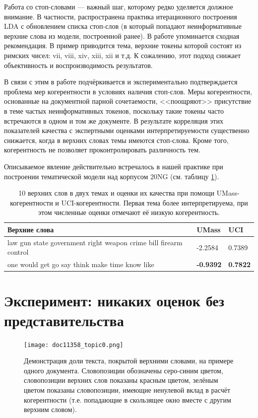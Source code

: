 Работа со стоп-словами --- важный шаг, которому редко уделяется должное внимание. В частности, распространена практика итерационного построения LDA с обновлением списка стоп-слов (в который попадают неинформативные верхние слова из модели, построенной ранее). В работе \cite{boydcare} упоминается сходная рекомендация. В пример приводится тема, верхние токены которой состоят из римских чисел: vii, viii, xiv, xiii, xii и т.д. К сожалению, этот подход снижает объективность и воспроизводимость результатов.

В связи с этим в работе \cite{fan2019assessing} подчёркивается и экспериментально подтверждается проблема мер когерентности в условиях наличия стоп-слов. Меры когерентности, основанные на документной парной сочетаемости, <<поощряют>> присутствие в теме частых неинформативных токенов, поскольку такие токены часто встречаются в одном и том же документе. В результате корреляция этих показателей качества с экспертными оценками интерпретируемости существенно снижается, когда в верхних словах темы имеются стоп-слова. Кроме того, когерентность не позволяет проконтролировать различность тем.

Описываемое явление действительно встречалось в нашей практике при построении тематической модели над корпусом 20NG (см. таблицу \ref{fig:law_gun_would}).

\begin{table}[ht]
    \caption{10 верхних слов в двух темах и оценки их качества при помощи UMass-когерентности и UCI-когерентности. Первая тема более интерпретируема, при этом численные оценки отмечают её низкую когерентность.}
    \label{fig:law_gun_would}
    \small
    \begin{tabular}{ | p{7.5cm}| p{3.5cm} |p{3.5cm} |}
    \hline
    Верхние слова &  UMass & UCI
    \\ \hline	
law gun state government right weapon crime bill firearm control &
-2.2584 & 0.7389
    \\ \hline
one would get go say think make time know like & \textbf{-0.9392} & \textbf{0.7822}
    \\ \hline
    \end{tabular}
\end{table}

\section{Эксперимент: никаких оценок без представительства}
\label{sec:represented}


\begin{figure}
        \texttt{[image: doc11358\_topic0.png]} %
    \caption{Демонстрация доли текста, покрытой верхними словами, на примере одного документа. Словопозиции обозначены серо-синим цветом, словопозиции верхних слов показаны красным цветом, зелёным цветом показаны словопозиции, имеющие ненулевой вклад в расчёт когерентности (т.е. попадающие в скользящее окно вместе с другим верхним словом).}
\label{fig:ch3_doc_compound}
\end{figure}



